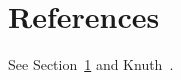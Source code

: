 \documentclass[11pt]{article}
\begin{document}
\section{References}\label{sec:ref} See Section~\ref{sec:ref} and Knuth~\cite{knuth}.
\end{document}

